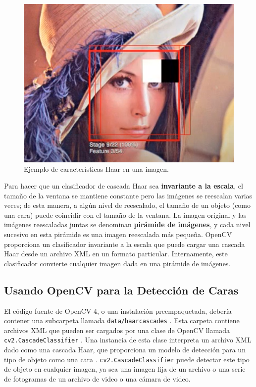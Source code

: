 \documentclass[a4paper]{article}
\begin{document}
\begin{figure}[H]
\begin{minipage}[b]{0.32\textwidth}
        \includegraphics[width=\textwidth]{../img/hf3.png}
    \end{minipage}
    \caption{Ejemplo de características Haar en una imagen.}
\end{figure}

Para hacer que un clasificador de cascada Haar sea \textbf{invariante a la escala}, el tamaño de la ventana se mantiene constante pero las imágenes se reescalan varias veces; de esta manera, a algún nivel de reescalado, el tamaño de un objeto (como una cara) puede coincidir con el tamaño de la ventana. La imagen original y las imágenes reescaladas juntas se denominan \textbf{pirámide de imágenes}, y cada nivel sucesivo en esta pirámide es una imagen reescalada más pequeña. OpenCV proporciona un clasificador invariante a la escala que puede cargar una cascada Haar desde un archivo XML en un formato particular. Internamente, este clasificador convierte cualquier imagen dada en una pirámide de imágenes.

\subsection{Usando OpenCV para la Detección de Caras}

El código fuente de OpenCV 4, o una instalación preempaquetada, debería contener una subcarpeta llamada \texttt{data/haarcascades} . Esta carpeta contiene archivos XML que pueden ser cargados por una clase de OpenCV llamada \texttt{cv2.CascadeClassifier} . Una instancia de esta clase interpreta un archivo XML dado como una cascada Haar, que proporciona un modelo de detección para un tipo de objeto como una cara . \texttt{cv2.CascadeClassifier} puede detectar este tipo de objeto en cualquier imagen, ya sea una imagen fija de un archivo o una serie de fotogramas de un archivo de video o una cámara de video.
\end{document}
